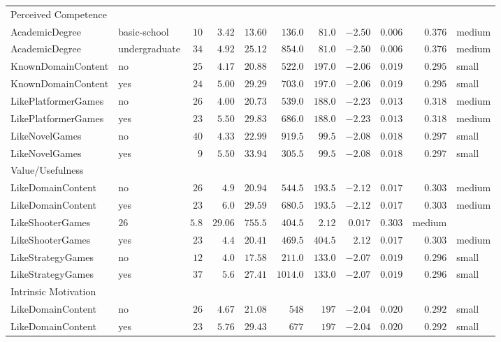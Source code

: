 \documentclass[6pt]{article}
\begin{document}
\begin{landscape}
{\begin{longtable}{llrrrrrrrrl}
Perceived Competence & & & & & & & & & & \tabularnewline
AcademicDegree&basic-school&$10$&$3.42$&$13.60$&$ 136.0$&$ 81.0$&$-2.50$&$0.006$&$0.376$&medium\tabularnewline
AcademicDegree&undergraduate&$34$&$4.92$&$25.12$&$ 854.0$&$ 81.0$&$-2.50$&$0.006$&$0.376$&medium\tabularnewline

KnownDomainContent&no&$25$&$4.17$&$20.88$&$ 522.0$&$197.0$&$-2.06$&$0.019$&$0.295$&small\tabularnewline
KnownDomainContent&yes&$24$&$5.00$&$29.29$&$ 703.0$&$197.0$&$-2.06$&$0.019$&$0.295$&small\tabularnewline

LikePlatformerGames&no&$26$&$4.00$&$20.73$&$ 539.0$&$188.0$&$-2.23$&$0.013$&$0.318$&medium\tabularnewline
LikePlatformerGames&yes&$23$&$5.50$&$29.83$&$ 686.0$&$188.0$&$-2.23$&$0.013$&$0.318$&medium\tabularnewline

LikeNovelGames&no&$40$&$4.33$&$22.99$&$ 919.5$&$ 99.5$&$-2.08$&$0.018$&$0.297$&small\tabularnewline
LikeNovelGames&yes&$ 9$&$5.50$&$33.94$&$ 305.5$&$ 99.5$&$-2.08$&$0.018$&$0.297$&small\tabularnewline
\hline

Value/Usefulness & & & & & & & & & & \tabularnewline
LikeDomainContent&no&$26$&$4.9$&$20.94$&$ 544.5$&$193.5$&$-2.12$&$0.017$&$0.303$&medium\tabularnewline
LikeDomainContent&yes&$23$&$6.0$&$29.59$&$ 680.5$&$193.5$&$-2.12$&$0.017$&$0.303$&medium\tabularnewline

LikeShooterGames&$26$&$5.8$&$29.06$&$ 755.5$&$404.5$&$ 2.12$&$0.017$&$0.303$&medium\tabularnewline
LikeShooterGames&yes&$23$&$4.4$&$20.41$&$ 469.5$&$404.5$&$ 2.12$&$0.017$&$0.303$&medium\tabularnewline

LikeStrategyGames&no&$12$&$4.0$&$17.58$&$ 211.0$&$133.0$&$-2.07$&$0.019$&$0.296$&small\tabularnewline
LikeStrategyGames&yes&$37$&$5.6$&$27.41$&$1014.0$&$133.0$&$-2.07$&$0.019$&$0.296$&small\tabularnewline

\hline

Intrinsic Motivation & & & & & & & & & & \tabularnewline
LikeDomainContent&no&$26$&$4.67$&$21.08$&$548$&$197$&$-2.04$&$0.020$&$0.292$&small\tabularnewline
LikeDomainContent&yes&$23$&$5.76$&$29.43$&$677$&$197$&$-2.04$&$0.020$&$0.292$&small\tabularnewline
\hline
\end{longtable}}
\end{landscape}
\end{document}
